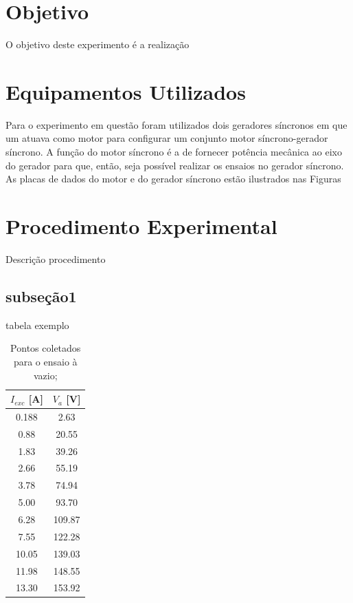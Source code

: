 \documentclass[a4paper, 12pt]{article}
\begin{document}
\newpage
\tableofcontents
\thispagestyle{empty}

\newpage
{}

\section{Objetivo}

O objetivo deste experimento é a realização 
\section{Equipamentos Utilizados}

Para o experimento em questão foram utilizados dois geradores síncronos em que um atuava como motor para configurar um conjunto motor síncrono-gerador síncrono. A função do motor síncrono é a de fornecer potência mecânica ao eixo do gerador para que, então, seja possível realizar os ensaios no gerador síncrono. As placas de dados do motor e do gerador síncrono estão ilustrados nas Figuras 

\section{Procedimento Experimental}

Descrição procedimento

\subsection{subseção1}

tabela exemplo

\begin{table}[htb]
\centering
\begin{tabular}{c|c}
$I_{exc}$ [A] & $V_{a}$ [V] \\ \hline
0.188   & 2.63      \\\hline
0.88 & 20.55    \\\hline
1.83 & 39.26 \\\hline
2.66 & 55.19 \\\hline
3.78 & 74.94 \\\hline
5.00 & 93.70 \\\hline
6.28 & 109.87 \\\hline
7.55 & 122.28 \\\hline
10.05 & 139.03 \\\hline
11.98 & 148.55 \\\hline
13.30 & 153.92 
\end{tabular}
\caption{Pontos coletados para o ensaio à vazio;}
\label{vazio}
\end{table}
\end{document}
